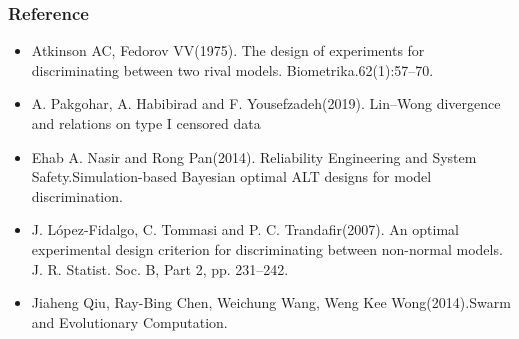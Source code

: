 \documentclass[xcolor=dvipsnames,aspectratio=1610]{beamer}
\begin{document}




\begin{frame}
\frametitle{Reference}
\begin{itemize}

\item Atkinson AC, Fedorov VV(1975). The design of experiments for discriminating between two rival models. Biometrika.62(1):57–70.

\item A. Pakgohar, A. Habibirad and F. Yousefzadeh(2019). Lin–Wong divergence and relations on type I censored data

\item Ehab A. Nasir and Rong Pan(2014). Reliability Engineering and System Safety.Simulation-based Bayesian optimal ALT designs for model discrimination.

\item J. López-Fidalgo, C. Tommasi and P. C. Trandafir(2007). An optimal experimental design criterion for discriminating between non-normal models. J. R. Statist. Soc. B, Part 2, pp. 231–242.

\item Jiaheng Qiu, Ray-Bing Chen, Weichung Wang, Weng Kee Wong(2014).Swarm and Evolutionary Computation.

\end{itemize}
\end{frame}
\end{document}
